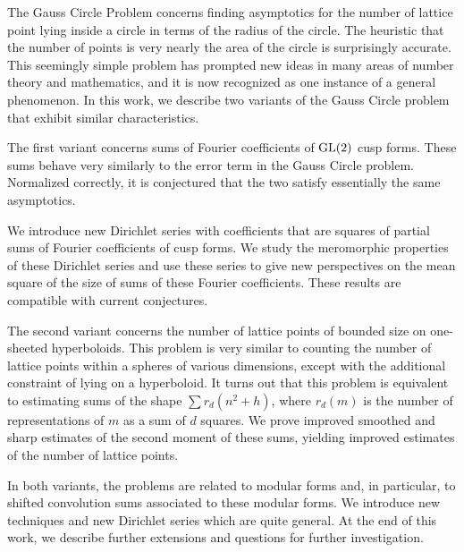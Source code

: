 
The Gauss Circle Problem concerns finding asymptotics for the number of lattice point
lying inside a circle in terms of the radius of the circle.
The heuristic that the number of points is very nearly the area of the circle is
surprisingly accurate.
This seemingly simple problem has prompted new ideas in many areas of number theory and
mathematics, and it is now recognized as one instance of a general phenomenon.
In this work, we describe two variants of the Gauss Circle problem that exhibit similar
characteristics.




The first variant concerns sums of Fourier coefficients of $\operatorname{GL}(2)$ cusp forms.
These sums behave very similarly to the error term in the Gauss Circle problem.
Normalized correctly, it is conjectured that the two satisfy essentially the same
asymptotics.


We introduce new Dirichlet series with coefficients that are squares of partial sums of
Fourier coefficients of cusp forms.
We study the meromorphic properties of these Dirichlet series and use these series to give
new perspectives on the mean square of the size of sums of these Fourier coefficients.
These results are compatible with current conjectures.




The second variant concerns the number of lattice points of bounded size on one-sheeted
hyperboloids.
This problem is very similar to counting the number of lattice points
within a spheres of various dimensions, except with the additional constraint of lying on
a hyperboloid.
It turns out that this problem is equivalent to estimating sums of the shape
$\sum r_d(n^2 + h)$, where $r_d(m)$ is the number of representations of $m$ as a sum of
$d$ squares.
We prove improved smoothed and sharp estimates of the second moment of these sums,
yielding improved estimates of the number of lattice points.




In both variants, the problems are related to modular forms and, in particular, to shifted
convolution sums associated to these modular forms.
We introduce new techniques and new Dirichlet series which are quite general.
At the end of this work, we describe further extensions and questions for further
investigation.




